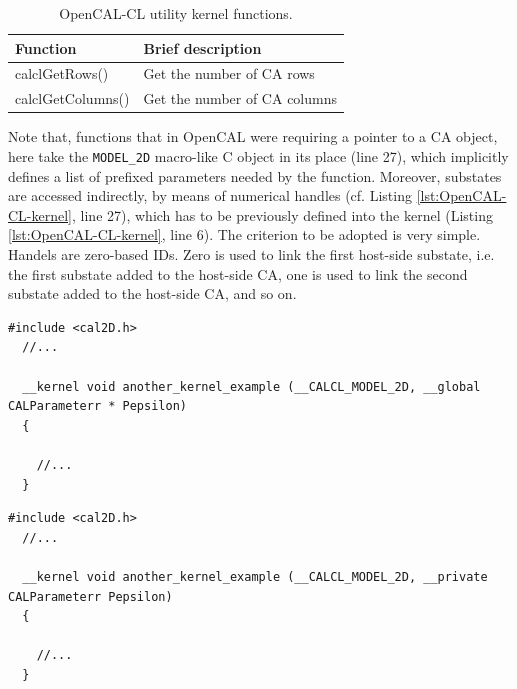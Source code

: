 \begin{table}
  \centering
  \begin{tabular}{l|l}
    \hline
    Function & Brief description\\
    \hline
    \hline
    calclGetRows()     & Get the number of CA rows \\
    calclGetColumns()  & Get the number of CA columns \\
    \hline
  \end{tabular}
  \caption{OpenCAL-CL utility kernel functions.}
  \label{tab:kernl-utility-function}
\end{table} 


Note that, functions that in OpenCAL were requiring a pointer to a CA
object, here take the \verb'MODEL_2D' macro-like C object in its place
(line 27), which implicitly defines a list of prefixed parameters
needed by the function. Moreover, substates are accessed indirectly,
by means of numerical handles (cf. Listing
\ref{lst:OpenCAL-CL-kernel}, line 27), which has to be previously
defined into the kernel (Listing \ref{lst:OpenCAL-CL-kernel}, line
6). The criterion to be adopted is very simple. Handels are zero-based
IDs. Zero is used to link the first host-side substate, i.e. the
first substate added to the host-side CA, one is used to link the
second substate added to the host-side CA, and so on.

\begin{lstlisting}[float,floatplacement=H, label=lst:Another-OpenCAL-CL-kernel, caption={Another example of OpenCAL-CL kernel, with an additional global parameter.}] 
  #include <cal2D.h>
  //...
    
  __kernel void another_kernel_example (__CALCL_MODEL_2D, __global CALParameterr * Pepsilon)
  {
    
    //...
  }
\end{lstlisting}

\begin{lstlisting}[float,floatplacement=H, label=lst:kernel-private-parameter, caption={Another example of OpenCAL-CL kernel, with an additional private parameter.}] 
  #include <cal2D.h>
  //...
    
  __kernel void another_kernel_example (__CALCL_MODEL_2D, __private CALParameterr Pepsilon)
  {
    
    //...
  }
\end{lstlisting}



